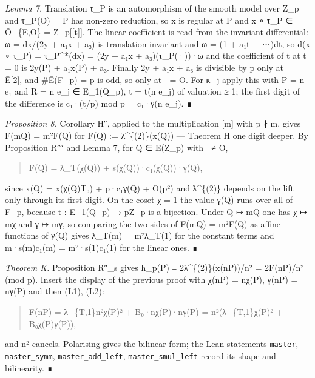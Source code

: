 \documentclass[11pt,a4paper]{article}
\theoremstyle{named}
\begin{document}
\textit{Lemma 7.} Translation τ\_P is an automorphism of the smooth model over Z\_p and τ\_P(O) = P has non-zero reduction, so x is regular at P and x ∘ τ\_P ∈ Ô\_\{E,O\} = Z\_p[[t]]. The linear coefficient is read from the invariant differential: ω = dx/(2y + a₁x + a₃) is translation-invariant and ω = (1 + a₁t + ⋯)dt, so d(x ∘ τ\_P) = τ\_P\textasciicircum{}*(dx) = (2y + a₁x + a₃)(τ\_P(·))·ω and the coefficient of t at t = 0 is 2y(P) + a₁x(P) + a₃. Finally 2y + a₁x + a₃ is divisible by p only at  ∈ Ē[2], and \#Ē(F\_p) = p is odd, so only at  = O. For κ\_j apply this with P = n e₁ and R = n e\_j ∈ E\_1(Q\_p), t = t(n e\_j) of valuation ≥ 1; the first digit of the difference is c₁·(t/p) mod p = c₁·γ(n e\_j). ∎

\textit{Proposition 8.} Corollary H″, applied to the multiplication [m] with p ∤ m, gives F(mQ) = m²F(Q) for F(Q) := λ\textasciicircum{}\{(2)\}(x(Q)) — Theorem H one digit deeper. By Proposition R⁗ and Lemma 7, for Q ∈ E(Z\_p) with  ≠ O,

\begin{quote}
F(Q) = λ\_T(χ(Q)) + s(χ(Q))·c₁(χ(Q))·γ(Q),
\end{quote}

since x(Q) = x(χ(Q)T₀) + p·c₁γ(Q) + O(p²) and λ\textasciicircum{}\{(2)\} depends on the lift only through its first digit. On the coset χ = 1 the value γ(Q) runs over all of F\_p, because t : E\_1(Q\_p) → pZ\_p is a bijection. Under Q ↦ mQ one has χ ↦ mχ and γ ↦ mγ, so comparing the two sides of F(mQ) = m²F(Q) as affine functions of γ(Q) gives λ\_T(m) = m²λ\_T(1) for the constant terms and m·s(m)c₁(m) = m²·s(1)c₁(1) for the linear ones. ∎

\textit{Theorem K.} Proposition R″\_s gives h\_p(P) ≡ 2λ\textasciicircum{}\{(2)\}(x(nP))/n² = 2F(nP)/n² (mod p). Insert the display of the previous proof with χ(nP) = nχ(P), γ(nP) = nγ(P) and then (L1), (L2):

\begin{quote}
F(nP) = λ\_\{T,1\}n²χ(P)² + B₀·nχ(P)·nγ(P) = n²(λ\_\{T,1\}χ(P)² + B₀χ(P)γ(P)),
\end{quote}

and n² cancels. Polarising gives the bilinear form; the Lean statements \texttt{master}, \texttt{master\_\allowbreak{}symm}, \texttt{master\_\allowbreak{}add\_\allowbreak{}left}, \texttt{master\_\allowbreak{}smul\_\allowbreak{}left} record its shape and bilinearity. ∎
\end{document}

